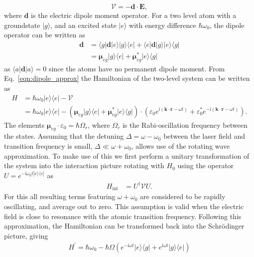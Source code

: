 \begin{equation}
\mathcal{V} = -{\mathbf{d}}\cdot {\mathbf{E}},
\end{equation}
where ${\mathbf{d}}$ is the electric dipole moment operator. For a two level atom with a groundstate $| g \rangle$, and an excited state $| e \rangle$ with energy difference $\hbar \omega_0$, the dipole operator can be written as
\begin{align}\label{eqn:dipole_approx}
\mathbf{d} &= \langle g|\mathbf{d}|e \rangle | g \rangle \langle e | + \langle e|\mathbf{d}|g \rangle | e \rangle \langle g | \nonumber \\
&= \boldsymbol{\mu}_{eg} | g \rangle \langle e | + \boldsymbol{\mu}_{eg}^{*} | e \rangle \langle g |
\end{align}
as $\langle a|\mathbf{d}|a \rangle = 0$ since the atoms have no permanent dipole moment. From Eq.~\eqref{eqn:dipole_approx} the Hamiltonian of the two-level system can be written as
\begin{align}
    H &= \hbar\omega_0 |e\rangle\langle e |  - \mathcal{V} \nonumber \\
      &=  \hbar\omega_0 |e\rangle\langle e | - (\boldsymbol{\mu}_{eg} | g \rangle \langle e | + \boldsymbol{\mu}_{eg}^{*} | e \rangle \langle g |)\cdot ( \varepsilon_0 e^{\textrm{i}\left(\mathbf{k}\cdot\mathbf{r} - \omega t\right)} +  \varepsilon_0^{*} e^{-\textrm{i}\left(\mathbf{k}\cdot\mathbf{r} - \omega t\right)}).
\end{align}
The elements $\boldsymbol{\mu}_{eg}\cdot \varepsilon_0 = \hbar\Omega_r$, where $\Omega_r$ is the Rabi-oscillation frequency between the states. Assuming that the detuning $\Delta = \omega - \omega_0$ between the laser field and transition frequency is small, $\Delta \ll \omega + \omega_0$, allows use of the rotating wave approximation. To make use of this we first perform a unitary transformation of the system into the interaction picture rotating with $H_0$ using the operator $U = e^{-\textrm{i}\omega_0 t|e\rangle\langle e|}$ as
\begin{align}
    H_{\textrm{int}} & = U^{\dagger} \mathcal{V} U.
\end{align}
For this all resulting terms featuring $\omega + \omega_0$ are considered to be rapidly oscillating, and average out to zero. This assumption is valid when the electric field is close to resonance with the atomic transition frequency. Following this approximation, the Hamiltonian can be transformed back into the Schr\"odinger picture, giving
\begin{align}
 H^{'} = \hbar\omega_0 - \hbar\Omega\left(e^{-\textrm{i}\omega t}|e\rangle\langle g|   + e^{\textrm{i}\omega t}|g\rangle\langle e|  \right)
\end{align}

